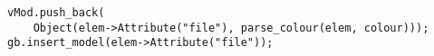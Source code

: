 \begin{lstlisting}
vMod.push_back(
    Object(elem->Attribute("file"), parse_colour(elem, colour)));
gb.insert_model(elem->Attribute("file"));
\end{lstlisting}
